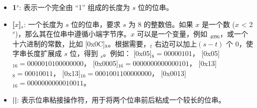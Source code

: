 \documentclass[main\_\_CN.tex]{subfiles}
\begin{document}
\begin{itemize}

    \item {\bfseries 1\begin{math}^s\end{math}}:
        表示一个完全由 “1” 组成的长度为 \begin{math}s\end{math} 位的位串。

    \item {\bfseries [\begin{math}x\end{math}]\begin{math}_{s}\end{math}}:
       一个长度为 \begin{math}s\end{math} 位的位串，要求 \begin{math}s\end{math} 为 8 的整数倍。如果 \begin{math}x\end{math} 是一个数 (\begin{math}x\end{math} < 2\begin{math}^s\end{math})，那么其在位串中遵循小端字节序。\begin{math}x\end{math} 可以是一个变量，例如 \begin{math}[Y]_{4096}\end{math}，或一个十六进制的常数，比如 [0x0C]\begin{math}_{8}\end{math}。根据需要，\begin{math}[x]_{t}\end{math} 右边可以加上\begin{math} (s-t)\end{math} 个 0，使字串长度扩展成 \begin{math}s\end{math} 位，得到 \begin{math}[x]_{s}\end{math}。例如：
       [0x05]\begin{math}_{8} = 00000101\end{math}，
       [0x05]\begin{math}_{16} = 00000101 00000000\end{math}，
       [0x0005]\begin{math}_{16} = 00000000 00000101\end{math}，
       [0x13]\begin{math}_{8} = 00010011\end{math}，
       [0x13]\begin{math}_{16} = 00010011 00000000\end{math}，
       [0x0013]\begin{math}_{16} = 00000000 00010011\end{math}。

    \item {\bfseries ||}:
       表示位串粘接操作符，用于将两个位串前后粘成一个较长的位串。
\end{itemize}
\end{document}
